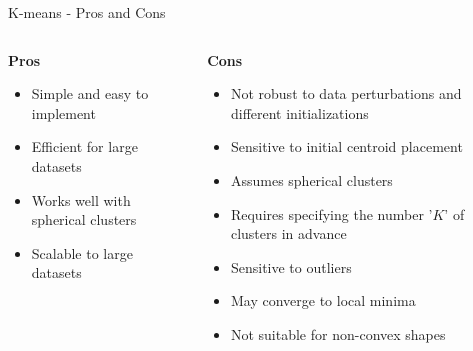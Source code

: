 \begin{frame}[allowframebreaks]{K-means - Pros and Cons}
\begin{columns}
    \begin{column}{0.45\textwidth}
        \textbf{Pros}
        \begin{itemize}
            \setlength{\itemsep}{1em}
            \item Simple and easy to implement
            \item Efficient for large datasets
            \item Works well with spherical clusters
            \item Scalable to large datasets
        \end{itemize}
    \end{column}
    \begin{column}{0.55\textwidth}
        \textbf{Cons}
        \begin{itemize}
            \setlength{\itemsep}{1em}
            \item Not robust to data perturbations and different initializations
            \item Sensitive to initial centroid placement
            \item Assumes spherical clusters
            \item Requires specifying the number '$K$' of clusters in advance
            \item Sensitive to outliers
            \item May converge to local minima
            \item Not suitable for non-convex shapes
        \end{itemize}
    \end{column}
\end{columns}
\end{frame}